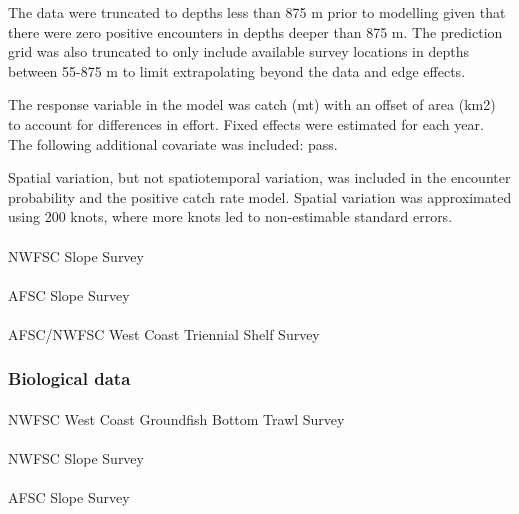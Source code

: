 \documentclass[
]{scrartcl}
\makeatletter
\let\oldparagraph\paragraph
\renewcommand{\paragraph}{
    \@ifstar
      \xxxParagraphStar
      \xxxParagraphNoStar
  }
\newcommand{\xxxParagraphStar}[1]{\oldparagraph*{#1}\mbox{}}
\newcommand{\xxxParagraphNoStar}[1]{\oldparagraph{#1}\mbox{}}
\makeatother
\begin{document}
The data were truncated to depths less than 875 m prior to modelling
given that there were zero positive encounters in depths deeper than 875
m. The prediction grid was also truncated to only include available
survey locations in depths between 55-875 m to limit extrapolating
beyond the data and edge effects.

The response variable in the model was catch (mt) with an offset of area
(km2) to account for differences in effort. Fixed effects were estimated
for each year. The following additional covariate was included: pass.

Spatial variation, but not spatiotemporal variation, was included in the
encounter probability and the positive catch rate model. Spatial
variation was approximated using 200 knots, where more knots led to
non-estimable standard errors.

\paragraph{NWFSC Slope Survey}\label{nwfsc-slope-survey}

\paragraph{AFSC Slope Survey}\label{afsc-slope-survey}

\paragraph{AFSC/NWFSC West Coast Triennial Shelf
Survey}\label{afscnwfsc-west-coast-triennial-shelf-survey}

\subsubsection{Biological data}\label{biological-data-1}

\paragraph{NWFSC West Coast Groundfish Bottom Trawl
Survey}\label{nwfsc-west-coast-groundfish-bottom-trawl-survey-1}

\paragraph{NWFSC Slope Survey}\label{nwfsc-slope-survey-1}

\paragraph{AFSC Slope Survey}\label{afsc-slope-survey-1}
\end{document}
